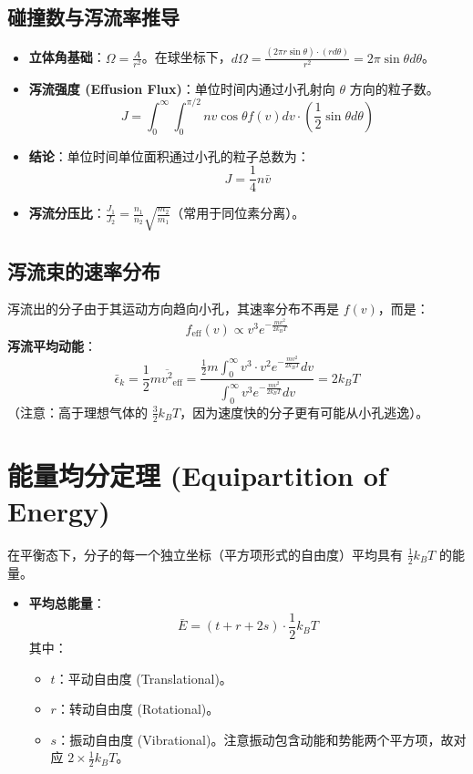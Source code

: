 \documentclass{article}
\begin{document}
\subsection{碰撞数与泻流率推导}
\begin{itemize}
    \item \textbf{立体角基础}：$\Omega = \frac{A}{r^2}$。在球坐标下，$d\Omega = \frac{(2\pi r \sin\theta) \cdot (r d\theta)}{r^2} = 2\pi \sin\theta d\theta$。
    \item \textbf{泻流强度 (Effusion Flux)}：单位时间内通过小孔射向 $\theta$ 方向的粒子数。
    \[ J = \int_0^\infty \int_0^{\pi/2} n v \cos\theta f(v) dv \cdot \left( \frac{1}{2} \sin\theta d\theta \right) \]
    \item \textbf{结论}：单位时间单位面积通过小孔的粒子总数为：
    \[ J = \frac{1}{4} n \bar{v} \]
    \item \textbf{泻流分压比}：$\frac{J_1}{J_2} = \frac{n_1}{n_2} \sqrt{\frac{m_2}{m_1}}$（常用于同位素分离）。
\end{itemize}

\subsection{泻流束的速率分布}
泻流出的分子由于其运动方向趋向小孔，其速率分布不再是 $f(v)$，而是：
\[ f_{\text{eff}}(v) \propto v^3 e^{-\frac{mv^2}{2k_B T}} \]
\textbf{泻流平均动能}：
\[ \bar{\epsilon}_k = \frac{1}{2} m \overline{v^2}_{\text{eff}} = \frac{\frac{1}{2}m \int_0^\infty v^3 \cdot v^2 e^{-\frac{mv^2}{2k_B T}} dv}{\int_0^\infty v^3 e^{-\frac{mv^2}{2k_B T}} dv} = 2k_B T \]
（注意：高于理想气体的 $\frac{3}{2}k_B T$，因为速度快的分子更有可能从小孔逃逸）。

\section{能量均分定理 (Equipartition of Energy)}

在平衡态下，分子的每一个独立坐标（平方项形式的自由度）平均具有 $\frac{1}{2} k_B T$ 的能量。
\begin{itemize}
    \item \textbf{平均总能量}：
    \[ \bar{E} = (t + r + 2s) \cdot \frac{1}{2} k_B T \]
    其中：
    \begin{itemize}
        \item $t$：平动自由度 (Translational)。
        \item $r$：转动自由度 (Rotational)。
        \item $s$：振动自由度 (Vibrational)。注意振动包含动能和势能两个平方项，故对应 $2 \times \frac{1}{2} k_B T$。
    \end{itemize}
\end{itemize}
\end{document}
